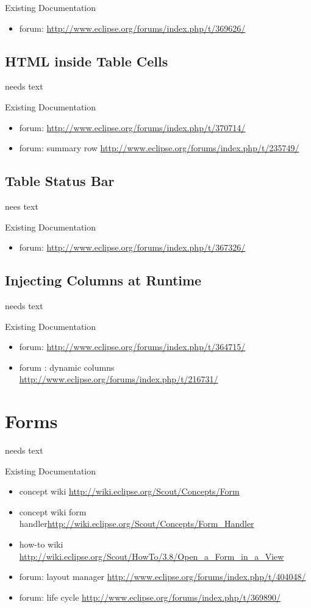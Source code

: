 \documentclass[a4paper,10pt,twoside]{book}
\begin{document}
\noindent Existing Documentation
\begin{itemize}
  \item forum: \url{http://www.eclipse.org/forums/index.php/t/369626/}
\end{itemize}

\subsection{HTML inside Table Cells}
needs text

\noindent Existing Documentation
\begin{itemize}
  \item forum: \url{http://www.eclipse.org/forums/index.php/t/370714/}
  \item forum: summary row \url{http://www.eclipse.org/forums/index.php/t/235749/}
\end{itemize}

\subsection{Table Status Bar}
nees text

\noindent Existing Documentation
\begin{itemize}
  \item forum: \url{http://www.eclipse.org/forums/index.php/t/367326/}
\end{itemize}

\subsection{Injecting Columns at Runtime}
needs text

\noindent Existing Documentation
\begin{itemize}
  \item forum: \url{http://www.eclipse.org/forums/index.php/t/364715/}
  \item forum : dynamic columns \url{http://www.eclipse.org/forums/index.php/t/216731/}
\end{itemize}
	
\section{Forms}
needs text

\noindent Existing Documentation
\begin{itemize}
  \item concept wiki \url{http://wiki.eclipse.org/Scout/Concepts/Form}
  \item concept wiki form handler\url{http://wiki.eclipse.org/Scout/Concepts/Form_Handler}
  \item how-to wiki \url{http://wiki.eclipse.org/Scout/HowTo/3.8/Open_a_Form_in_a_View}
  \item forum: layout manager \url{http://www.eclipse.org/forums/index.php/t/404048/}
  \item forum: life cycle \url{http://www.eclipse.org/forums/index.php/t/369890/}
\end{itemize}
\end{document}
